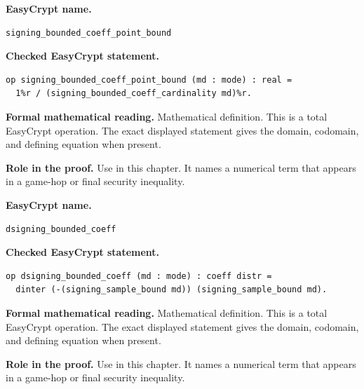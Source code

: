 \begin{formaldefinition}
\noindent\textbf{EasyCrypt name.}
\begin{lstlisting}[language=EasyCrypt,basicstyle=\ttfamily\scriptsize]
signing_bounded_coeff_point_bound
\end{lstlisting}
\noindent\textbf{Checked EasyCrypt statement.}
\begin{lstlisting}[language=EasyCrypt,basicstyle=\ttfamily\scriptsize]
op signing_bounded_coeff_point_bound (md : mode) : real =
  1%r / (signing_bounded_coeff_cardinality md)%r.
\end{lstlisting}
\noindent\textbf{Formal mathematical reading.}
Mathematical definition. This is a total EasyCrypt operation.  The exact displayed statement gives the domain, codomain, and defining equation when present.

\noindent\textbf{Role in the proof.}
Use in this chapter. It names a numerical term that appears in a game-hop or final security inequality.

\end{formaldefinition}

\begin{formaldefinition}
\noindent\textbf{EasyCrypt name.}
\begin{lstlisting}[language=EasyCrypt,basicstyle=\ttfamily\scriptsize]
dsigning_bounded_coeff
\end{lstlisting}
\noindent\textbf{Checked EasyCrypt statement.}
\begin{lstlisting}[language=EasyCrypt,basicstyle=\ttfamily\scriptsize]
op dsigning_bounded_coeff (md : mode) : coeff distr =
  dinter (-(signing_sample_bound md)) (signing_sample_bound md).
\end{lstlisting}
\noindent\textbf{Formal mathematical reading.}
Mathematical definition. This is a total EasyCrypt operation.  The exact displayed statement gives the domain, codomain, and defining equation when present.

\noindent\textbf{Role in the proof.}
Use in this chapter. It names a numerical term that appears in a game-hop or final security inequality.

\end{formaldefinition}


